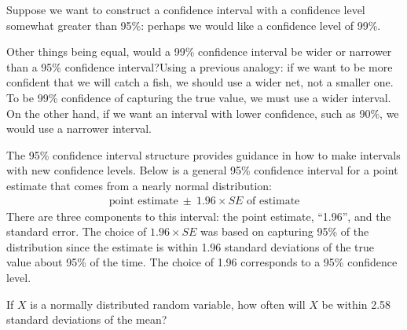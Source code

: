 
Suppose we want to construct a confidence interval with a confidence level somewhat greater than 95\%: perhaps we would like a confidence level of 99\%. 

\begin{examplewrap}
\begin{nexample}{Other things being equal, would a 99\% confidence interval be wider or narrower than a 95\% confidence interval?}Using a previous analogy: if we want to be more confident that we will catch a fish, we should use a wider net, not a smaller one. To be 99\% confidence of capturing the true value, we must use a wider interval. On the other hand, if we want an interval with lower confidence, such as 90\%, we would use a narrower interval.
\end{nexample}
\end{examplewrap}

The 95\% confidence interval structure provides guidance in how to make intervals with new confidence levels. Below is a general 95\% confidence interval for a point estimate that comes from a nearly normal distribution:
\begin{eqnarray}
\text{point estimate}\ \pm\ 1.96\times SE \text{ of estimate}
\end{eqnarray}
There are three components to this interval: the point estimate, ``1.96'', and the standard error. The choice of $1.96\times SE$ was based on capturing 95\% of the distribution since the estimate is within 1.96 standard deviations of the true value about 95\% of the time. The choice of 1.96 corresponds to a 95\% confidence level. 

\D{\newpage}

\begin{exercisewrap}
\begin{nexercise} \label{leadInForMakingA99PercentCIExercise}
If $X$ is a normally distributed random variable, how often will $X$ be within 2.58 standard deviations of the mean?\footnotemark
\end{nexercise}
\end{exercisewrap}


